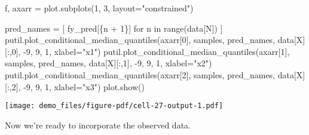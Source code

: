 \documentclass[
  letterpaper,
  DIV=11,
  numbers=noendperiod]{scrartcl}
\newenvironment{Shaded}{\begin{snugshade}}{\end{snugshade}}
\newcommand{\BuiltInTok}[1]{\textcolor[rgb]{0.00,0.23,0.31}{#1}}
\newcommand{\ControlFlowTok}[1]{\textcolor[rgb]{0.00,0.23,0.31}{#1}}
\newcommand{\DecValTok}[1]{\textcolor[rgb]{0.68,0.00,0.00}{#1}}
\newcommand{\KeywordTok}[1]{\textcolor[rgb]{0.00,0.23,0.31}{#1}}
\newcommand{\NormalTok}[1]{\textcolor[rgb]{0.00,0.23,0.31}{#1}}
\newcommand{\OperatorTok}[1]{\textcolor[rgb]{0.37,0.37,0.37}{#1}}
\newcommand{\SpecialCharTok}[1]{\textcolor[rgb]{0.37,0.37,0.37}{#1}}
\newcommand{\SpecialStringTok}[1]{\textcolor[rgb]{0.13,0.47,0.30}{#1}}
\newcommand{\StringTok}[1]{\textcolor[rgb]{0.13,0.47,0.30}{#1}}
\begin{document}
\begin{Shaded}
\begin{Highlighting}[]
\NormalTok{f, axarr }\OperatorTok{=}\NormalTok{ plot.subplots(}\DecValTok{1}\NormalTok{, }\DecValTok{3}\NormalTok{, layout}\OperatorTok{=}\StringTok{"constrained"}\NormalTok{)}

\NormalTok{pred\_names }\OperatorTok{=}\NormalTok{ [ }\SpecialStringTok{f\textquotesingle{}y\_pred[}\SpecialCharTok{\{}\NormalTok{n }\OperatorTok{+} \DecValTok{1}\SpecialCharTok{\}}\SpecialStringTok{]\textquotesingle{}} \ControlFlowTok{for}\NormalTok{ n }\KeywordTok{in} \BuiltInTok{range}\NormalTok{(data[}\StringTok{\textquotesingle{}N\textquotesingle{}}\NormalTok{]) ]}
\NormalTok{putil.plot\_conditional\_median\_quantiles(axarr[}\DecValTok{0}\NormalTok{], samples, pred\_names,}
\NormalTok{                                        data[}\StringTok{\textquotesingle{}X\textquotesingle{}}\NormalTok{][:,}\DecValTok{0}\NormalTok{], }\OperatorTok{{-}}\DecValTok{9}\NormalTok{, }\DecValTok{9}\NormalTok{, }\DecValTok{1}\NormalTok{,}
\NormalTok{                                        xlabel}\OperatorTok{=}\StringTok{"x1"}\NormalTok{)}
\NormalTok{putil.plot\_conditional\_median\_quantiles(axarr[}\DecValTok{1}\NormalTok{], samples, pred\_names,}
\NormalTok{                                        data[}\StringTok{\textquotesingle{}X\textquotesingle{}}\NormalTok{][:,}\DecValTok{1}\NormalTok{], }\OperatorTok{{-}}\DecValTok{9}\NormalTok{, }\DecValTok{9}\NormalTok{, }\DecValTok{1}\NormalTok{,}
\NormalTok{                                        xlabel}\OperatorTok{=}\StringTok{"x2"}\NormalTok{)}
\NormalTok{putil.plot\_conditional\_median\_quantiles(axarr[}\DecValTok{2}\NormalTok{], samples, pred\_names,}
\NormalTok{                                        data[}\StringTok{\textquotesingle{}X\textquotesingle{}}\NormalTok{][:,}\DecValTok{2}\NormalTok{], }\OperatorTok{{-}}\DecValTok{9}\NormalTok{, }\DecValTok{9}\NormalTok{, }\DecValTok{1}\NormalTok{,}
\NormalTok{                                        xlabel}\OperatorTok{=}\StringTok{"x3"}\NormalTok{)}
\NormalTok{plot.show()}
\end{Highlighting}
\end{Shaded}

\texttt{[image: demo\_files/figure-pdf/cell-27-output-1.pdf]}

Now we're ready to incorporate the observed data.
\end{document}
